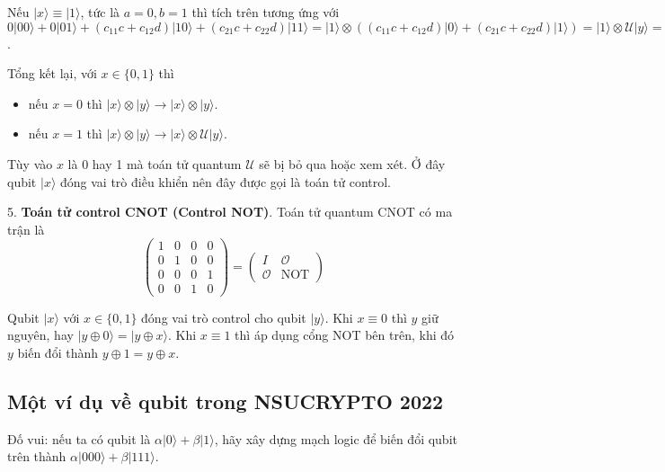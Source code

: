 Nếu $\lvert x \rangle \equiv \lvert 1 \rangle$, tức là $a = 0, b = 1$ thì tích trên tương ứng với $0 \lvert 00 \rangle + 0 \lvert 01 \rangle + (c_{11} c + c_{12} d) \lvert 10 \rangle + (c_{21} c + c_{22} d) \lvert 11 \rangle = \lvert 1 \rangle \otimes ((c_{11} c + c_{12} d) \lvert 0 \rangle + (c_{21} c + c_{22} d) \lvert 1 \rangle) = \lvert 1 \rangle \otimes \mathcal{U} \lvert y \rangle = \lvert x \rangle \otimes \mathcal{U} \lvert y \rangle$.

Tổng kết lại, với $x \in \{ 0, 1\}$ thì

\begin{itemize}
    \item nếu $x = 0$ thì $\lvert x \rangle \otimes \lvert y \rangle \to \lvert x \rangle \otimes \lvert y \rangle$.
    \item nếu $x = 1$ thì $\lvert x \rangle \otimes \lvert y \rangle \to \lvert x \rangle \otimes \mathcal{U} \lvert y \rangle$.
\end{itemize}

Tùy vào $x$ là 0 hay 1 mà toán tử quantum $\mathcal{U}$ sẽ bị bỏ qua hoặc xem xét. Ở đây qubit $\lvert x \rangle$ đóng vai trò điều khiển nên đây được gọi là toán tử control.

5. \textbf{Toán tử control CNOT (Control NOT)}. Toán tử quantum CNOT có ma trận là
\begin{equation*}
    \begin{pmatrix} 1 & 0 & 0 & 0 \\ 0 & 1 & 0 & 0 \\ 0 & 0 & 0 & 1 \\ 0 & 0 & 1 & 0 \end{pmatrix} = \begin{pmatrix} I & \mathcal{O} \\ \mathcal{O} & \text{NOT} \end{pmatrix}
\end{equation*}

Qubit $\lvert x \rangle$ với $x \in \{ 0, 1 \}$ đóng vai trò control cho qubit $\lvert y \rangle$. Khi $x \equiv 0$ thì $y$ giữ nguyên, hay $\lvert y \oplus 0 \rangle = \lvert y \oplus x \rangle$. Khi $x \equiv 1$ thì áp dụng cổng NOT bên trên, khi đó $y$ biến đổi thành $y \oplus 1 = y \oplus x$.

\subsection*{Một ví dụ về qubit trong NSUCRYPTO 2022}

Đố vui: nếu ta có qubit là $\alpha \lvert 0 \rangle + \beta \lvert 1 \rangle$, hãy xây dựng mạch logic để biến đổi qubit trên thành $\alpha \lvert 000 \rangle + \beta \lvert 111 \rangle$.


